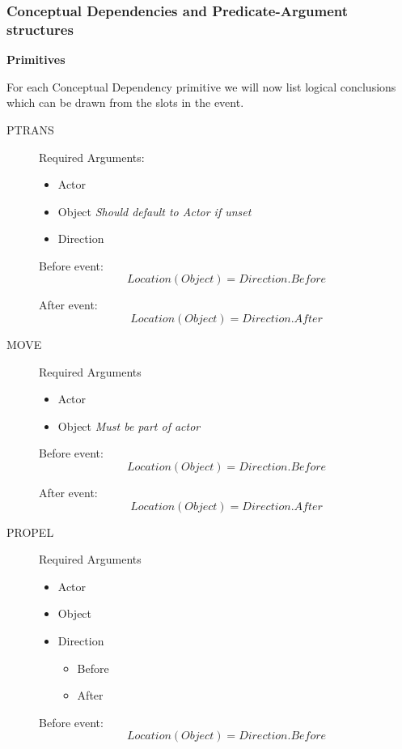 \documentclass[../dissertation]{subfiles}
\begin{document}
\subsubsection{Conceptual Dependencies and Predicate-Argument structures}

\textbf{Primitives}

For each Conceptual Dependency primitive we will now list logical conclusions which can be drawn from the slots in the event.

\begin{description}
\item[PTRANS]\hfill

Required Arguments:

\begin{itemize}
\item Actor
\item Object \textit{Should default to Actor if unset}
\item Direction
\end{itemize}

Before event:
\[Location(Object) = \textit{Direction.Before}\]

After event:
\[Location(Object) = \textit{Direction.After}\]


\item[MOVE]\hfill

Required Arguments
\begin{itemize}
\item Actor
\item Object \textit{Must be part of actor}
\end{itemize}

Before event:
\[Location(Object) = \textit{Direction.Before}\]

After event:
\[Location(Object) = \textit{Direction.After}\]

\item[PROPEL]\hfill

Required Arguments
\begin{itemize}
	\item Actor
    \item Object
    \item Direction
    \begin{itemize}
    	\item Before
        \item After
    \end{itemize}
\end{itemize}

Before event:
\[Location(Object) = \textit{Direction.Before}\]


\end{description}
\end{document}
